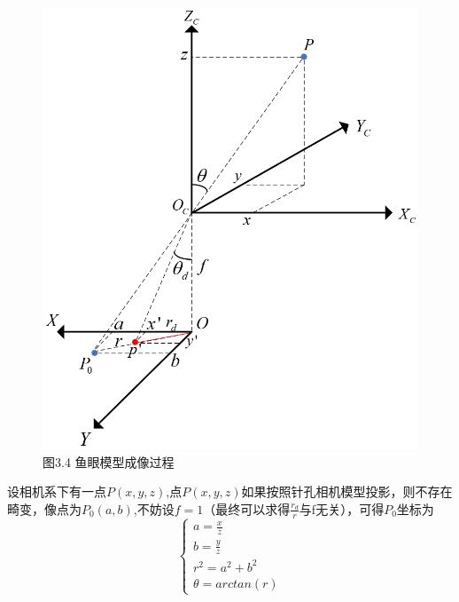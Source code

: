 \documentclass[40pt,a4paper，UTF8]{ctexart}
\numberwithin{equation}{section}
\begin{document}
\begin{figure}[H]
\centering
\includegraphics[width=4.8in]{ch4_3_5.png} {图3.4 鱼眼模型成像过程}
\end{figure}

设相机系下有一点$P(x,y,z)$,点$P(x,y,z)$如果按照针孔相机模型投影，则不存在畸变，像点为$P_0(a,b)$,不妨设$f=1$（最终可以求得$\frac{r_d}{r}$与f无关），可得$P_0坐标为$
\begin{equation}
\left\{
\begin{array}{l}
a = \frac{x}{z}\\
b = \frac{y}{z}\\
r^2=a^2+b^2\\
\theta = arctan(r)
\end{array}
\right.
\end{equation}
\end{document}
